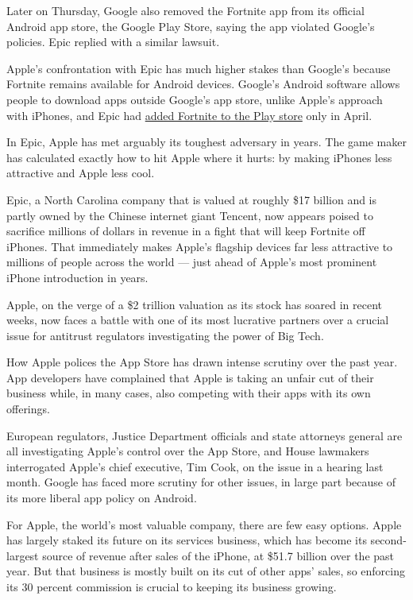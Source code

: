 Later on Thursday, Google also removed the Fortnite app from its
official Android app store, the Google Play Store, saying the app
violated Google's policies. Epic replied with a similar lawsuit.

Apple's confrontation with Epic has much higher stakes than Google's
because Fortnite remains available for Android devices. Google's Android
software allows people to download apps outside Google's app store,
unlike Apple's approach with iPhones, and Epic had
\href{https://www.theverge.com/2020/4/21/21229943/epic-games-fortnite-google-play-store-available-third-party-software}{added
Fortnite to the Play store} only in April.

In Epic, Apple has met arguably its toughest adversary in years. The
game maker has calculated exactly how to hit Apple where it hurts: by
making iPhones less attractive and Apple less cool.

Epic, a North Carolina company that is valued at roughly \$17 billion
and is partly owned by the Chinese internet giant Tencent, now appears
poised to sacrifice millions of dollars in revenue in a fight that will
keep Fortnite off iPhones. That immediately makes Apple's flagship
devices far less attractive to millions of people across the world ---
just ahead of Apple's most prominent iPhone introduction in years.

Apple, on the verge of a \$2 trillion valuation as its stock has soared
in recent weeks, now faces a battle with one of its most lucrative
partners over a crucial issue for antitrust regulators investigating the
power of Big Tech.

How Apple polices the App Store has drawn intense scrutiny over the past
year. App developers have complained that Apple is taking an unfair cut
of their business while, in many cases, also competing with their apps
with its own offerings.

European regulators, Justice Department officials and state attorneys
general are all investigating Apple's control over the App Store, and
House lawmakers interrogated Apple's chief executive, Tim Cook, on the
issue in a hearing last month. Google has faced more scrutiny for other
issues, in large part because of its more liberal app policy on Android.

For Apple, the world's most valuable company, there are few easy
options. Apple has largely staked its future on its services business,
which has become its second-largest source of revenue after sales of the
iPhone, at \$51.7 billion over the past year. But that business is
mostly built on its cut of other apps' sales, so enforcing its 30
percent commission is crucial to keeping its business growing.

